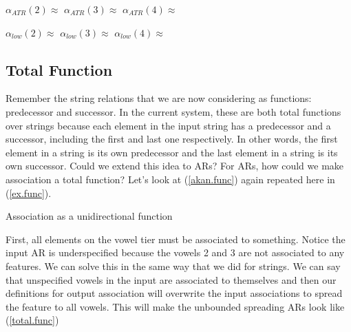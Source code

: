 \documentclass[,doc,floatsintext]{apa6}
\theoremstyle{definition}
\theoremstyle{definition}
\theoremstyle{definition}
\theoremstyle{remark}
\begin{document}
\noindent \(\alpha_{ATR}(2)\approx\) \hspace{0.75in}
\(\alpha_{ATR}(3)\approx\) \hspace{0.75in} \(\alpha_{ATR}(4)\approx\)
\vspace{0.5in}

\noindent \(\alpha_{low}(2)\approx\) \hspace{0.75in}
\(\alpha_{low}(3)\approx\) \hspace{0.75in} \(\alpha_{low}(4)\approx\)
\vspace{0.5in}

\subsection{Total Function}\label{total-function}

Remember the string relations that we are now considering as functions:
predecessor and successor. In the current system, these are both total
functions over strings because each element in the input string has a
predecessor and a successor, including the first and last one
respectively. In other words, the first element in a string is its own
predecessor and the last element in a string is its own successor. Could
we extend this idea to ARs? For ARs, how could we make association a
total function? Let's look at (\ref{akan.func}) again repeated here in
(\ref{ex.func}).

\begin{exe}
\ex \label{ex.func} Association as a unidirectional function \\
\end{exe}

\noindent First, all elements on the vowel tier must be associated to
something. Notice the input AR is underspecified because the vowels 2
and 3 are not associated to any features. We can solve this in the same
way that we did for strings. We can say that unspecified vowels in the
input are associated to themselves and then our definitions for output
association will overwrite the input associations to spread the feature
to all vowels. This will make the unbounded spreading ARs look like
(\ref{total.func})
\end{document}
